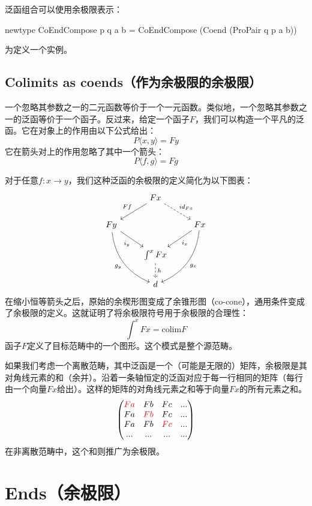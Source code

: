 \documentclass[DaoFP]{subfiles}
\begin{document}
 \begin{exercise}
  泛函组合可以使用余极限表示：
  \begin{haskell}
   newtype CoEndCompose p q a b = CoEndCompose (Coend (ProPair q p a b))
  \end{haskell}
  为定义一个实例。
 \end{exercise}

 \subsection{Colimits as coends（作为余极限的余极限）}
 一个忽略其参数之一的二元函数等价于一个一元函数。类似地，一个忽略其参数之一的泛函等价于一个函子。反过来，给定一个函子$F$，我们可以构造一个平凡的泛函。它在对象上的作用由以下公式给出：
 \[P \langle x, y \rangle = F y \]
 它在箭头对上的作用忽略了其中一个箭头：
 \[P \langle f, g \rangle = F g \]

 对于任意$f \colon x \to y$，我们这种泛函的余极限的定义简化为以下图表：
 \[
  \begin{tikzcd}
   & F x
   \arrow[ld, "F f"']
   \arrow[rd, dashed, "id_{F x}"]
   \\
   F y
   \arrow[dr, "i_y"']
   \arrow[ddr, bend right,  "g_y"']
   && F x
   \arrow[dl, "i_x"]
   \arrow[ddl, bend left,  "g_x"]
   \\
   &\int^x F x
   \arrow[d, dashed, "h"]
   \\
   &d
  \end{tikzcd}
 \]
 在缩小恒等箭头之后，原始的余楔形图变成了余锥形图（co-cone），通用条件变成了余极限的定义。这就证明了将余极限符号用于余极限的合理性：
 \[ \int^x F x = \text{colim} F \]
 函子$F$定义了目标范畴中的一个图形。这个模式是整个源范畴。

 如果我们考虑一个离散范畴，其中泛函是一个（可能是无限的）矩阵，余极限是其对角线元素的和（余并）。沿着一条轴恒定的泛函对应于每一行相同的矩阵（每行由一个向量$F x$给出）。这样的矩阵的对角线元素之和等于向量$F x$的所有元素之和。
 \[
  \begin{pmatrix}
   \color{red} F a & F b & F c & ... \\
   F a & \color{red}F b & F c & ...\\
   F a & F b &\color{red}F c & ...\\
   ... & ... & ... & ...
  \end{pmatrix}
 \]
 在非离散范畴中，这个和则推广为余极限。


 \section{Ends（余极限）}
\end{document}
